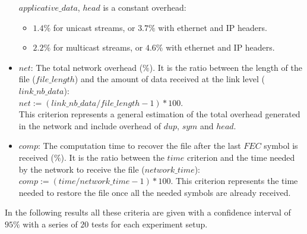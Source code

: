 \documentclass[a4paper]{article}
\begin{document}
\begin{itemize}
{                    $applicative\_data$, $head$ is a constant overhead:
                    \begin{itemize}
                        \item{
                            $1.4\%$ for unicast streams, or $3.7\%$ with
                                ethernet and IP headers.
                        }
                        \item{
                            $2.2\%$ for multicast streams, or $4.6\%$ with
                                ethernet and IP headers.
                        }
                    \end{itemize}
            }
            \item{
                $net$: The total network overhead ($\%$). It is the ratio
                    between the length of the file ($file\_length$) and the
                    amount of data received at the link level
                    ($link\_nb\_data$):
                    \\
                    $net := (link\_nb\_data / file\_length - 1) * 100$.
                     \\
                     This criterion represents a general estimation of the
                     total overhead generated in the network and include
                     overhead of $dup$, $sym$ and $head$.
            }
            \item{
                $comp$: The computation time to recover the file after the last
                    $FEC$ symbol is received ($\%$). It is the ratio
                    between the $time$ criterion and the time needed by the
                    network to receive the file ($network\_time$):
                    $comp := (time / network\_time - 1) * 100$.  This criterion
                     represents the time needed to restore the file once all the
                     needed symbols are already received.
            }
        \end{itemize}
        In the following results all these criteria are given with a confidence
        interval of $95\%$ with a series of $20$ tests for each experiment
        setup.
\end{document}
